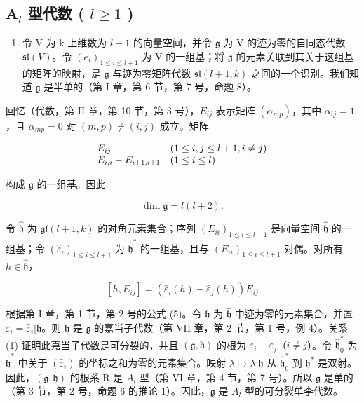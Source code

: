 \subsection{\texorpdfstring{\(\mathbf{A}_l\) 型代数 ( \(l \geq 1\) )}{\textbackslash mathbf\{A\}\_l 型代数 ( l \textbackslash geq 1 )}}

\begin{enumerate}
\def\labelenumi{(\Roman{enumi})}
\tightlist
\item
  令 V 为 k 上维数为 \(l+1\) 的向量空间，并令 \(\mathfrak{g}\) 为 V 的迹为零的自同态代数 \(\mathfrak{sl}(V)\)。令 \((e_{i})_{1\leq i\leq l+1}\) 为 V 的一组基；将 \(\mathfrak{g}\) 的元素关联到其关于这组基的矩阵的映射，是 \(\mathfrak{g}\) 与迹为零矩阵代数 \(\mathfrak{sl}(l+1,k)\) 之间的一个识别。我们知道 \(\mathfrak{g}\) 是半单的（第 I 章，第 6 节，第 7 号，命题 8）。
\end{enumerate}

回忆（代数，第 II 章，第 10 节，第 3 号），\(E_{ij}\) 表示矩阵 \((\alpha_{mp})\)，其中 \(\alpha_{ij} = 1\)，且 \(\alpha_{mp} = 0\) 对 \((m,p) \neq (i,j)\) 成立。矩阵

\[
\begin{array}{l l} E _ {i j} & (1 \leq i, j \leq l + 1, i \neq j) \\ E _ {i, i} - E _ {i + 1, i + 1} & (1 \leq i \leq l) \end{array}
\]

构成 \(\mathfrak{g}\) 的一组基。因此

\[
\dim \mathfrak {g} = l (l + 2).
\]

令 \(\hat{\mathfrak{h}}\) 为 \(\mathfrak{gl}(l + 1,k)\) 的对角元素集合；序列 \((E_{ii})_{1\leq i\leq l + 1}\) 是向量空间 \(\hat{\mathfrak{h}}\) 的一组基；令 \((\hat{\varepsilon}_i)_{1\leq i\leq l + 1}\) 为 \(\hat{\mathfrak{h}}^*\) 的一组基，且与 \((E_{ii})_{1\leq i\leq l + 1}\) 对偶。对所有 \(h\in \hat{\mathfrak{h}}\)，

\[
[ h, E _ {i j} ] = (\hat {\varepsilon} _ {i} (h) - \hat {\varepsilon} _ {j} (h)) E _ {i j}\tag{1}
\]

根据第 I 章，第 1 节，第 2 号的公式 (5)。令 \(\mathfrak{h}\) 为 \(\hat{\mathfrak{h}}\) 中迹为零的元素集合，并置 \(\varepsilon_i = \hat{\varepsilon}_i|\mathfrak{h}\)。则 \(\mathfrak{h}\) 是 \(\mathfrak{g}\) 的嘉当子代数（第 VII 章，第 2 节，第 1 号，例 4）。关系 (1) 证明此嘉当子代数是可分裂的，并且 \((\mathfrak{g},\mathfrak{h})\) 的根为 \(\varepsilon_i - \varepsilon_j\)（\(i\neq j\)）。令 \(\hat{\mathfrak{h}}_0^*\) 为 \(\hat{\mathfrak{h}}^*\) 中关于 \((\hat{\varepsilon}_i)\) 的坐标之和为零的元素集合。映射 \(\lambda \mapsto \lambda |\mathfrak{h}\) 从 \(\hat{\mathfrak{h}}_0^*\) 到 \(\mathfrak{h}^*\) 是双射。因此，\((\mathfrak{g},\mathfrak{h})\) 的根系 R 是 \(A_l\) 型（第 VI 章，第 4 节，第 7 号）。所以 \(\mathfrak{g}\) 是单的（第 3 节，第 2 号，命题 6 的推论 1）。因此，\(\mathfrak{g}\) 是 \(A_l\) 型的可分裂单李代数。

